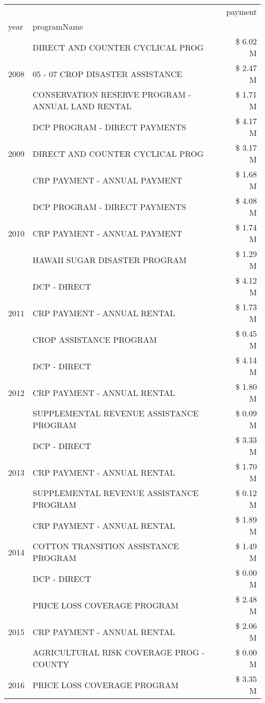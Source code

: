 \begin{tabular}{llr}
\toprule
 &  & payment \\
year & programName &  \\
\midrule
\multirow[t]{3}{*}{2008} & DIRECT AND COUNTER CYCLICAL PROG & \$ 6.02 M \\
 & 05 - 07 CROP DISASTER ASSISTANCE & \$ 2.47 M \\
 & CONSERVATION RESERVE PROGRAM - ANNUAL LAND RENTAL & \$ 1.71 M \\
\cline{1-3}
\multirow[t]{3}{*}{2009} & DCP PROGRAM - DIRECT PAYMENTS & \$ 4.17 M \\
 & DIRECT AND COUNTER CYCLICAL PROG & \$ 3.17 M \\
 & CRP PAYMENT - ANNUAL PAYMENT & \$ 1.68 M \\
\cline{1-3}
\multirow[t]{3}{*}{2010} & DCP PROGRAM - DIRECT PAYMENTS & \$ 4.08 M \\
 & CRP PAYMENT - ANNUAL PAYMENT & \$ 1.74 M \\
 & HAWAII SUGAR DISASTER PROGRAM & \$ 1.29 M \\
\cline{1-3}
\multirow[t]{3}{*}{2011} & DCP - DIRECT & \$ 4.12 M \\
 & CRP PAYMENT - ANNUAL RENTAL & \$ 1.73 M \\
 & CROP ASSISTANCE PROGRAM & \$ 0.45 M \\
\cline{1-3}
\multirow[t]{3}{*}{2012} & DCP - DIRECT & \$ 4.14 M \\
 & CRP PAYMENT - ANNUAL RENTAL & \$ 1.80 M \\
 & SUPPLEMENTAL REVENUE ASSISTANCE PROGRAM & \$ 0.09 M \\
\cline{1-3}
\multirow[t]{3}{*}{2013} & DCP - DIRECT & \$ 3.33 M \\
 & CRP PAYMENT - ANNUAL RENTAL & \$ 1.70 M \\
 & SUPPLEMENTAL REVENUE ASSISTANCE PROGRAM & \$ 0.12 M \\
\cline{1-3}
\multirow[t]{3}{*}{2014} & CRP PAYMENT - ANNUAL RENTAL & \$ 1.89 M \\
 & COTTON TRANSITION ASSISTANCE PROGRAM & \$ 1.49 M \\
 & DCP - DIRECT & \$ 0.00 M \\
\cline{1-3}
\multirow[t]{3}{*}{2015} & PRICE LOSS COVERAGE PROGRAM & \$ 2.48 M \\
 & CRP PAYMENT - ANNUAL RENTAL & \$ 2.06 M \\
 & AGRICULTURAL RISK COVERAGE PROG - COUNTY & \$ 0.00 M \\
\cline{1-3}
\multirow[t]{3}{*}{2016} & PRICE LOSS COVERAGE PROGRAM & \$ 3.35 M \\

\end{tabular}
